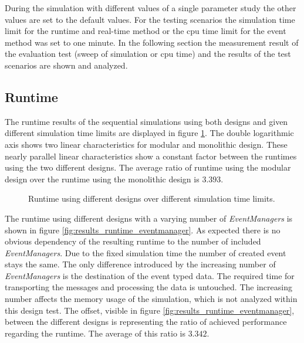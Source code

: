 During the simulation with different values of a single parameter study the other values are set to the default values.
For the testing scenarios the simulation time limit for the runtime and real-time method or the cpu time limit for the event method was set to one minute.
In the following section the measurement result of the evaluation test (sweep of simulation or cpu time) and the results of the test scenarios are shown and analyzed.

\subsection{Runtime}
\label{sec:measurements_sequential_runtime}

The runtime results of the sequential simulations using both designs and given different simulation time limits are displayed in figure \ref{fig:results_runtime_sim_time}.
The double logarithmic axis shows two linear characteristics for modular and monolithic design.
These nearly parallel linear characteristics show a constant factor between the runtimes using the two different designs.
The average ratio of runtime using the modular design over the runtime using the monolithic design is $3.393$.
\\

\begin{figure}
    \centering
    \caption{Runtime using different designs over different simulation time limits.}
    \label{fig:results_runtime_sim_time}
\end{figure}

The runtime using different designs with a varying number of \emph{EventManagers} is shown in figure \ref{fig:results_runtime_eventmanager}.
As expected there is no obvious dependency of the resulting runtime to the number of included \emph{EventManagers}.
Due to the fixed simulation time the number of created event stays the same.
The only difference introduced by the increasing number of \emph{EventManagers} is the destination of the event typed data.
The required time for transporting the messages and processing the data is untouched.
The increasing number affects the memory usage of the simulation, which is not analyzed within this design test.
The offset, visible in figure \ref{fig:results_runtime_eventmanager}, between the different designs is representing the ratio of achieved performance regarding the runtime.
The average of this ratio is $3.342$.
\\

